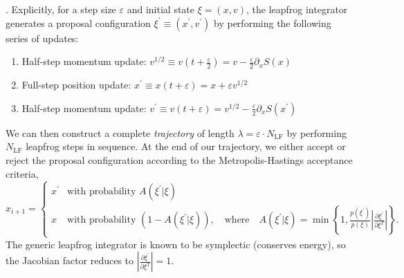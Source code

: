 \documentclass{article} %
\begin{document}
\).
%
Explicitly, for a step size \(\varepsilon\) and initial state \(\xi = (x, v)\), the leapfrog integrator generates a
proposal configuration \(\xi^{\prime} \equiv (x^{\prime}, v^{\prime})\) by performing the following series of updates: 
%
\begin{enumerate}
   \item Half-step momentum update: \hspace{12pt}\(%
      v^{1/2} \equiv v{\left(t+\frac{\varepsilon}{2}\right)} = v-\frac{\varepsilon}{2}\partial_{x}S(x)
   \)
   \item Full-step position update: \hspace{36pt}\(%
      x^{\prime} \equiv x(t+\varepsilon) = x + \varepsilon v^{1/2}
   \)
   \item Half-step momentum update:
      \hspace{18pt} \(%
         v^{\prime} \equiv v(t+\varepsilon) = v^{1/2} - \frac{\varepsilon}{2}\partial_{x} S(x^{\prime})
   \)
\end{enumerate}
%
We can then construct a complete \emph{trajectory} of length \(\lambda = \varepsilon\cdot N_{\mathrm{LF}}\) by
performing \(N_{\mathrm{LF}}\) leapfrog steps in sequence.
%
At the end of our trajectory, we either accept or reject the proposal configuration according to the Metropolis-Hastings
acceptance criteria,
%
\begin{equation}
   x_{i+1} =
   \begin{cases}%
      x^{\prime} &\mbox{with probability } A(\xi^{\prime}|\xi) \\
      x &\mbox{with probability } (1 - A(\xi^{\prime}|\xi)), \quad\text{where}\quad %
         A(\xi^{\prime}|\xi) = \min\left\{%
            1, \frac{p(\xi^{\prime})}{p(\xi)}\left|\frac{\partial{\xi^{\prime}}}{\partial\xi^{T}}\right|%
         \right\}.
   \end{cases}
   \label{eq:mhcriteria}
\end{equation}
%
%
The generic leapfrog integrator is known to be symplectic (conserves energy), so the Jacobian factor reduces to
\(\left|\frac{\partial\xi^{\prime}}{\partial\xi^{T}}\right| = 1\). 
%
%
\end{document}
